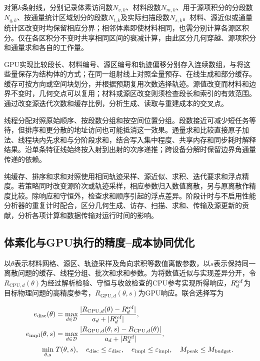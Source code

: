 \documentclass[UTF8, zihao=-4, fontset=none, a4paper]{ctexart}
\begin{document}
对第\(k\)条射线，分别记录体素访问数\(N_{v,k}\)、材料段数\(N_{m,k}\)、用于源项积分的分段数\(N_{q,k}\)、按通量统计区域划分的段数\(N_{t,k}\)及实际扫描段数\(N_{s,k}\)。材料、源近似或通量统计区改变时均保留相应分界；相邻体素即使材料相同，也需分别计算各源区积分。仅在各区积分不变时共享相同区间的衰减计算，由此区分几何穿越、源项积分和通量求和各自的工作量。

GPU实现比较段长、材料编号、源区编号和轨迹偏移分别存入连续数组，与将这些量保存为结构体的方式；在同一组射线上对照全量预存、在线生成和部分缓存。缓存可按方向或空间块划分，并根据预期复用次数选择轨迹。源值改变而材料和边界不变时，几何交点可以复用；材料或源区改变则须检查段长和索引的有效范围。通过改变源迭代次数和缓存比例，分析生成、读取与重建成本的交叉点。

线程分配对照原始顺序、按段数分组和按空间位置分组。段数接近可减少短任务等待，但排序和更分散的地址访问也可能抵消这一效果。通量求和比较直接原子加法、线程块内先求和与分阶段求和，结合写入集中程度、共享内存和同步耗时解释结果。沿单条特征线始终按入射到出射的次序递推；跨设备分解时保留边界角通量传递的依赖。

纯缓存、排序和求和对照使用相同轨迹采样、源近似、求积、迭代要求和浮点精度。若策略同时改变源阶次或轨迹采样，相应参数归入数值离散，另与原离散作精度比较。除响应和守恒外，检查求和顺序引起的浮点差异。阶段计时与不启用性能分析器的重复计时配合，区分几何生成、访存、扫描、求和、传输及源更新的贡献，分析各项计算和数据传输对运行时间的影响。

\subsection{体素化与GPU执行的精度--成本协同优化}

以\(\theta\)表示材料网格、源区、轨迹采样及角向求积等数值离散参数，以\(s\)表示保持同一离散问题的缓存、线程分组、批次和求和参数。为将数值近似与实现差异分开，令\(R_{\mathrm{CPU},d}(\theta)\)为经过解析检验、守恒与收敛检查的CPU参考实现所得响应，\(R_d^{\rm ref}\)为目标物理问题的高精度参考，\(R_{\mathrm{GPU},d}(\theta,s)\)为GPU响应。联合选择写为

\begin{equation}
\begin{aligned}
e_{\rm disc}(\theta)&=\max_{d\in\mathcal D}
 \frac{|R_{\mathrm{CPU},d}(\theta)-R_d^{\rm ref}|}{a_d+|R_d^{\rm ref}|},\\
e_{\rm impl}(\theta,s)&=\max_{d\in\mathcal D}
 \frac{|R_{\mathrm{GPU},d}(\theta,s)-R_{\mathrm{CPU},d}(\theta)|}{a_d+|R_d^{\rm ref}|},\\
\min_{\theta,s}\;&T(\theta,s),\quad
 e_{\rm disc}\leq\varepsilon_{\rm disc},\quad
 e_{\rm impl}\leq\varepsilon_{\rm impl},\quad
 M_{\rm peak}\leq M_{\rm budget}.
\end{aligned}
\label{eq:joint}
\end{equation}
\end{document}
